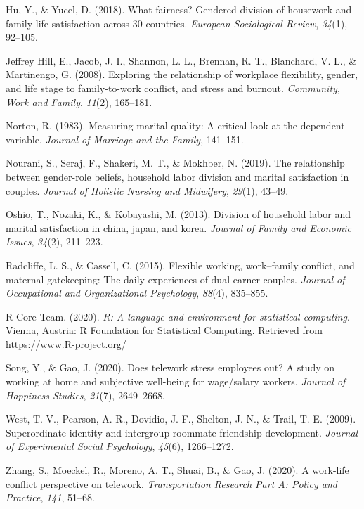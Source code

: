 \documentclass[
  english,
  man]{apa6}
\newlength{\cslhangindent}
\newenvironment{cslreferences}%
  {\setlength{\parindent}{0pt}%
  \everypar{\setlength{\hangindent}{\cslhangindent}}\ignorespaces}%
  {\par}
\begin{document}
\begin{cslreferences}
\leavevmode\hypertarget{ref-hu2018fairness}{}%
Hu, Y., \& Yucel, D. (2018). What fairness? Gendered division of housework and family life satisfaction across 30 countries. \emph{European Sociological Review}, \emph{34}(1), 92--105.

\leavevmode\hypertarget{ref-jeffrey2008exploring}{}%
Jeffrey Hill, E., Jacob, J. I., Shannon, L. L., Brennan, R. T., Blanchard, V. L., \& Martinengo, G. (2008). Exploring the relationship of workplace flexibility, gender, and life stage to family-to-work conflict, and stress and burnout. \emph{Community, Work and Family}, \emph{11}(2), 165--181.

\leavevmode\hypertarget{ref-norton1983measuring}{}%
Norton, R. (1983). Measuring marital quality: A critical look at the dependent variable. \emph{Journal of Marriage and the Family}, 141--151.

\leavevmode\hypertarget{ref-nourani2019relationship}{}%
Nourani, S., Seraj, F., Shakeri, M. T., \& Mokhber, N. (2019). The relationship between gender-role beliefs, household labor division and marital satisfaction in couples. \emph{Journal of Holistic Nursing and Midwifery}, \emph{29}(1), 43--49.

\leavevmode\hypertarget{ref-oshio2013division}{}%
Oshio, T., Nozaki, K., \& Kobayashi, M. (2013). Division of household labor and marital satisfaction in china, japan, and korea. \emph{Journal of Family and Economic Issues}, \emph{34}(2), 211--223.

\leavevmode\hypertarget{ref-radcliffe2015flexible}{}%
Radcliffe, L. S., \& Cassell, C. (2015). Flexible working, work--family conflict, and maternal gatekeeping: The daily experiences of dual-earner couples. \emph{Journal of Occupational and Organizational Psychology}, \emph{88}(4), 835--855.

\leavevmode\hypertarget{ref-R-base}{}%
R Core Team. (2020). \emph{R: A language and environment for statistical computing}. Vienna, Austria: R Foundation for Statistical Computing. Retrieved from \url{https://www.R-project.org/}

\leavevmode\hypertarget{ref-song2020does}{}%
Song, Y., \& Gao, J. (2020). Does telework stress employees out? A study on working at home and subjective well-being for wage/salary workers. \emph{Journal of Happiness Studies}, \emph{21}(7), 2649--2668.

\leavevmode\hypertarget{ref-west2009superordinate}{}%
West, T. V., Pearson, A. R., Dovidio, J. F., Shelton, J. N., \& Trail, T. E. (2009). Superordinate identity and intergroup roommate friendship development. \emph{Journal of Experimental Social Psychology}, \emph{45}(6), 1266--1272.

\leavevmode\hypertarget{ref-zhang2020work}{}%
Zhang, S., Moeckel, R., Moreno, A. T., Shuai, B., \& Gao, J. (2020). A work-life conflict perspective on telework. \emph{Transportation Research Part A: Policy and Practice}, \emph{141}, 51--68.
\end{cslreferences}

\endgroup
\end{document}
